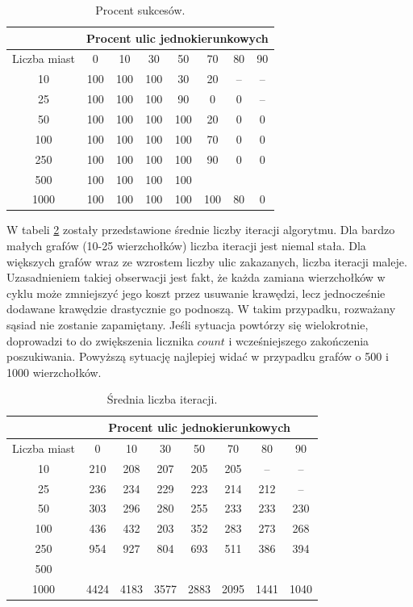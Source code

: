 \documentclass[11pt,a4paper,twoside]{article}
\begin{document}
\bgroup
\def\arraystretch{1.2}
\begin{table}[ht]
\centering
\begin{tabular}{|c|c|c|c|c|c|c|c|}
\hline
 & \multicolumn{7}{c|}{Procent ulic jednokierunkowych}\\\hline
Liczba miast & 0 & 10 & 30 & 50 & 70& 80& 90\\  \hline
10& 100& 100& 100& 30& 20& --& --\\ \hline
25& 100& 100& 100& 90& 0& 0& --\\ \hline
50& 100& 100& 100& 100& 20& 0& 0\\ \hline
100& 100& 100& 100& 100& 70& 0& 0\\ \hline
250& 100& 100& 100& 100& 90& 0& 0\\ \hline
500& 100& 100& 100& 100& & & \\ \hline
1000& 100& 100& 100& 100& 100& 80& 0\\ \hline
\end{tabular}
\caption{Procent sukcesów.}
\label{sukcesy}
\end{table}
\egroup

W tabeli \ref{liczbaIteracji} zostały przedstawione średnie liczby iteracji algorytmu. Dla bardzo małych grafów (10-25 wierzchołków) liczba iteracji jest niemal stała. Dla większych grafów wraz ze wzrostem liczby ulic zakazanych, liczba iteracji maleje. Uzasadnieniem takiej obserwacji jest fakt, że każda zamiana wierzchołków w cyklu może zmniejszyć jego koszt przez usuwanie krawędzi, lecz jednocześnie dodawane krawędzie drastycznie go podnoszą. W takim przypadku, rozważany sąsiad nie zostanie zapamiętany. Jeśli sytuacja powtórzy się wielokrotnie, doprowadzi to do zwiększenia licznika $count$ i wcześniejszego zakończenia poszukiwania. Powyższą sytuację najlepiej widać w przypadku grafów o 500 i 1000 wierzchołków.

\bgroup
\def\arraystretch{1.2}
\begin{table}[ht]
\centering
\begin{tabular}{|c|c|c|c|c|c|c|c|}
\hline
 & \multicolumn{7}{c|}{Procent ulic jednokierunkowych}\\\hline
Liczba miast & 0 & 10 & 30 & 50 & 70& 80& 90\\  \hline
10& 210& 208& 207& 205& 205& --& --\\ \hline
25& 236& 234& 229& 223& 214& 212& --\\ \hline
50& 303& 296& 280& 255& 233& 233& 230\\ \hline
100& 436& 432& 203& 352& 283& 273& 268\\ \hline
250& 954& 927& 804& 693& 511& 386& 394\\ \hline
500& & & & & & & \\ \hline
1000& 4424& 4183& 3577& 2883& 2095& 1441& 1040\\ \hline
\end{tabular}
\caption{Średnia liczba iteracji.}
\label{liczbaIteracji}
\end{table}
\egroup
\end{document}
